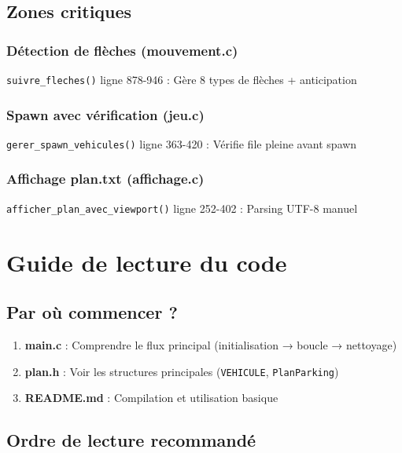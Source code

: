 \documentclass[12pt,a4paper]{article}
\begin{document}
\subsection{Zones critiques}

\subsubsection{Détection de flèches (mouvement.c)}

\texttt{suivre\_fleches()} ligne 878-946 : Gère 8 types de flèches + anticipation

\subsubsection{Spawn avec vérification (jeu.c)}

\texttt{gerer\_spawn\_vehicules()} ligne 363-420 : Vérifie file pleine avant spawn

\subsubsection{Affichage plan.txt (affichage.c)}

\texttt{afficher\_plan\_avec\_viewport()} ligne 252-402 : Parsing UTF-8 manuel


\section{Guide de lecture du code}

\subsection{Par où commencer ?}

\begin{enumerate}
    \item \textbf{main.c} : Comprendre le flux principal (initialisation → boucle → nettoyage)
    \item \textbf{plan.h} : Voir les structures principales (\texttt{VEHICULE}, \texttt{PlanParking})
    \item \textbf{README.md} : Compilation et utilisation basique
\end{enumerate}

\subsection{Ordre de lecture recommandé}
\end{document}
